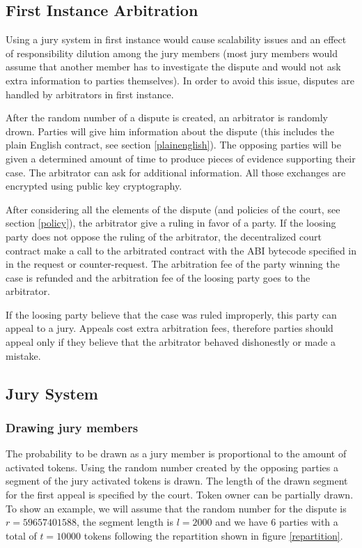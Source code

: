 \documentclass[12 pt]{article}
\begin{document}
\subsection{First Instance Arbitration}

Using a jury system in first instance would cause scalability issues and an effect of responsibility dilution among the jury members (most jury members would assume that another member has to investigate the dispute and would not ask extra information to parties themselves).
In order to avoid this issue, disputes are handled by arbitrators in first instance.


After the random number of a dispute is created, an arbitrator is randomly drown. Parties will give him information about the dispute (this includes the plain English contract, see section \ref{plainenglish}).
The opposing parties will be given a determined amount of time to produce pieces of evidence supporting their case. The arbitrator can ask for additional information.
All those exchanges are encrypted using public key cryptography.

After considering all the elements of the dispute (and policies of the court, see section \ref{policy}), the arbitrator give a ruling in favor of a party.
If the loosing party does not oppose the ruling of the arbitrator, the decentralized court contract make a call to the arbitrated contract with the ABI bytecode specified in in the request or counter-request. The arbitration fee of the party winning the case is refunded and the arbitration fee of the loosing party goes to the arbitrator.

If the loosing party believe that the case was ruled improperly, this party can appeal to a jury.
Appeals cost extra arbitration fees, therefore parties should appeal only if they believe that the arbitrator behaved dishonestly or made a mistake.

\subsection{Jury System}

\subsubsection{Drawing jury members}

The probability to be drawn as a jury member is proportional to the amount of activated tokens. Using the random number created by the opposing parties a segment of the jury activated tokens is drawn.
The length of the drawn segment for the first appeal is specified by the court. 
Token owner can be partially drawn.
To show an example, we will assume that the random number for the dispute is $r=59657401588$, the segment length is $l=2000$ and we have 6 parties with a total of $t=10 000$ tokens following the repartition shown in figure \ref{repartition}.
\end{document}
